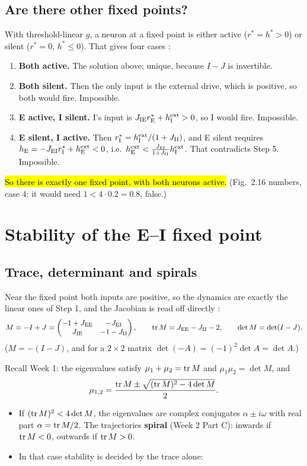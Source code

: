 \subsection{Are there other fixed points?}

With threshold-linear $g$, a neuron at a fixed point is either active ($r^*=h^*>0$) or silent ($r^*=0$, $h^*\le0$). That gives four cases :
\begin{enumerate}
  \item \textbf{Both active.} The solution above; unique, because $I-J$ is invertible.
  \item \textbf{Both silent.} Then the only input is the external drive, which is positive, so both would fire. Impossible.
  \item \textbf{E active, I silent.} I's input is $J_{\mathrm{I}\mathrm{E}}r_{\mathrm{E}}^*+h_{\mathrm{I}}^{\text{ext}}>0$, so I would fire. Impossible.
  \item \textbf{E silent, I active.} Then $r_{\mathrm{I}}^*=h_{\mathrm{I}}^{\text{ext}}/(1+J_{\mathrm{I}\mathrm{I}})$, and E silent requires $h_{\mathrm{E}}=-J_{\mathrm{E}\mathrm{I}}r_{\mathrm{I}}^*+h_{\mathrm{E}}^{\text{ext}}<0$, i.e.\ $h_{\mathrm{E}}^{\text{ext}}<\frac{J_{\mathrm{E}\mathrm{I}}}{1+J_{\mathrm{I}\mathrm{I}}}h_{\mathrm{I}}^{\text{ext}}$. That contradicts Step 5. Impossible.
\end{enumerate}
\hl{So there is exactly one fixed point, with both neurons active.} (Fig.\ 2.16 numbers, case 4: it would need $1<4\cdot0.2=0.8$, false.)

\section{Stability of the E--I fixed point}

\subsection{Trace, determinant and spirals}

Near the fixed point both inputs are positive, so the dynamics are exactly the linear ones of Step 1, and the Jacobian is read off directly :
\[ M=-I+J=\begin{pmatrix}-1+J_{\mathrm{E}\mathrm{E}}&-J_{\mathrm{E}\mathrm{I}}\\J_{\mathrm{I}\mathrm{E}}&-1-J_{\mathrm{I}\mathrm{I}}\end{pmatrix},\qquad \operatorname{tr} M=J_{\mathrm{E}\mathrm{E}}-J_{\mathrm{I}\mathrm{I}}-2,\qquad \det M=\det(I-J). \]
($M=-(I-J)$, and for a $2\times2$ matrix $\det(-A)=(-1)^2\det A=\det A$.)

Recall Week 1: the eigenvalues satisfy $\mu_1+\mu_2=\operatorname{tr} M$ and $\mu_1\mu_2=\det M$, and
\[ \mu_{1,2}=\frac{\operatorname{tr} M\pm\sqrt{(\operatorname{tr} M)^2-4\det M}}{2}. \]
\begin{itemize}
  \item If $(\operatorname{tr} M)^2<4\det M$, the eigenvalues are complex conjugates $\alpha\pm i\omega$ with real part $\alpha=\operatorname{tr} M/2$. The trajectories \textbf{spiral} (Week 2 Part C): inwards if $\operatorname{tr} M<0$, outwards if $\operatorname{tr} M>0$.
  \item In that case stability is decided by the trace alone:
\end{itemize}

